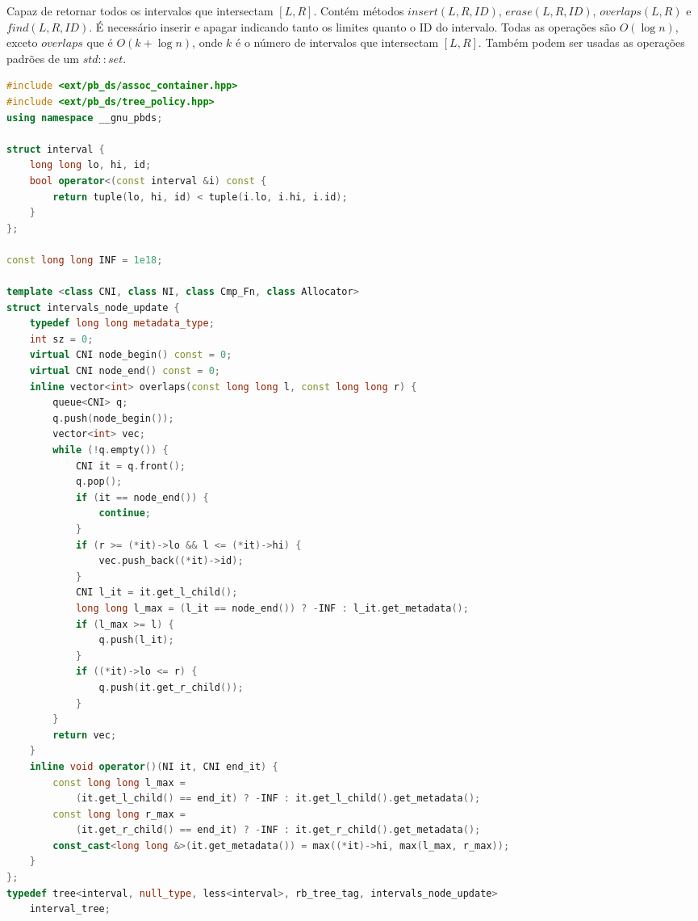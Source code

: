 \documentclass[11pt, a4paper, oneside]{book}
\begin{document}
Capaz de retornar todos os intervalos que intersectam $[L, R]$. Contém métodos $insert({L, R, ID})$, $erase({L, R, ID})$, $overlaps(L, R)$ e $find({L, R, ID})$. É necessário inserir e apagar indicando tanto os limites quanto o ID do intervalo. Todas as operações são $O(\log n)$, exceto $overlaps$ que é $O(k + \log n)$, onde $k$ é o número de intervalos que intersectam $[L, R]$. Também podem ser usadas as operações padrões de um $std::set$.

\hfill

\begin{multicols}{2}
\begin{lstlisting}[language=C++]
#include <ext/pb_ds/assoc_container.hpp>
#include <ext/pb_ds/tree_policy.hpp>
using namespace __gnu_pbds;

struct interval {
    long long lo, hi, id;
    bool operator<(const interval &i) const {
        return tuple(lo, hi, id) < tuple(i.lo, i.hi, i.id);
    }
};

const long long INF = 1e18;

template <class CNI, class NI, class Cmp_Fn, class Allocator>
struct intervals_node_update {
    typedef long long metadata_type;
    int sz = 0;
    virtual CNI node_begin() const = 0;
    virtual CNI node_end() const = 0;
    inline vector<int> overlaps(const long long l, const long long r) {
        queue<CNI> q;
        q.push(node_begin());
        vector<int> vec;
        while (!q.empty()) {
            CNI it = q.front();
            q.pop();
            if (it == node_end()) {
                continue;
            }
            if (r >= (*it)->lo && l <= (*it)->hi) {
                vec.push_back((*it)->id);
            }
            CNI l_it = it.get_l_child();
            long long l_max = (l_it == node_end()) ? -INF : l_it.get_metadata();
            if (l_max >= l) {
                q.push(l_it);
            }
            if ((*it)->lo <= r) {
                q.push(it.get_r_child());
            }
        }
        return vec;
    }
    inline void operator()(NI it, CNI end_it) {
        const long long l_max =
            (it.get_l_child() == end_it) ? -INF : it.get_l_child().get_metadata();
        const long long r_max =
            (it.get_r_child() == end_it) ? -INF : it.get_r_child().get_metadata();
        const_cast<long long &>(it.get_metadata()) = max((*it)->hi, max(l_max, r_max));
    }
};
typedef tree<interval, null_type, less<interval>, rb_tree_tag, intervals_node_update>
    interval_tree;
\end{lstlisting}
\end{multicols}
\end{document}

